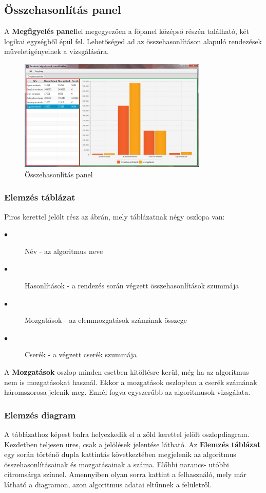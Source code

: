 \documentclass{elteikthesis}
\begin{document}
\subsection{Összehasonlítás panel}
A \textbf{Megfigyelés panel}lel megegyezően a főpanel középső részén található, két logikai egységből épül fel. Lehetőséged ad az összehasonlításon alapuló rendezések műveletigényeinek a vizsgálására.
 \begin{figure}[H]
 	\centering
 	\includegraphics[width=0.8\textwidth]{pics/benchmarkpanel.png}
 	\caption{Összehasonlítás panel}
 \end{figure}
\subsubsection{Elemzés táblázat}
Piros kerettel jelölt rész az ábrán, mely táblázatnak négy oszlopa van:
\begin{description}
	\item[$\bullet$] Név - az algoritmus neve
	\item[$\bullet$] Hasonlítások - a rendezés során végzett összehasonlítások szummája
	\item[$\bullet$] Mozgatások - az elemmozgatások számának összege
	\item[$\bullet$] Cserék - a végzett cserék szummája
\end{description}
A \textbf{Mozgatások} oszlop minden esetben kitöltésre kerül, még ha az algoritmus nem is mozgatásokat használ. Ekkor a mozgatások oszlopban a cserék számának háromszorosa jelenik meg. Ennél fogva egyszerűbb az algoritmusok vizsgálata.
\subsubsection{Elemzés diagram}
A táblázathoz képest balra helyezkedik el a zöld kerettel jelölt oszlopdiagram. Kezdetben teljesen üres, csak a jelölések jelentése látható. Az \textbf{Elemzés táblázat} egy során történő dupla kattintás következtében megjelenik az algoritmus összehasonlításainak és mozgatásainak a száma. Előbbi narancs- utóbbi citromsárga színnel. Amennyiben olyan sorra kattint a felhasználó, mely már látható a diagramon, azon algoritmus adatai eltűnnek a felületről.
\end{document}
